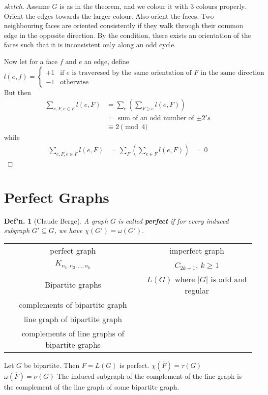 \documentclass[12pt, a4paper]{book}
\newtheorem{definition}[theorem]{Def'n.}
\theoremstyle{nonumberplain}
\newtheorem{proof}{Proof}
\begin{document}
\begin{proof}[sketch]
    Assume $G$ is as in the theorem, and we colour it with 3 colours properly.
    Orient the edges towards the larger colour.
    Also orient the faces.
    Two neighbouring faces are oriented consistently if they walk through their common edge in the opposite direction.
    By the condition, there exists an orientation of the faces such that it is inconsistent only along an odd cycle.
    
    Now let for a face $f$ and $e$ an edge, define
    \begin{equation*}l(e,f)=
        \begin{cases}
            +1 &\text{if $e$ is traveresed by the same orientation of $F$ in the same direction}\\
            -1 &\text{otherwise}
        \end{cases}
    \end{equation*}
    But then
    \begin{align*}
        \sum\limits_{e,F,e\in F}l(e,F) &= \sum\limits_{e}\left(\sum\limits_{F\ni e} l(e,F)\right)\\
                                       &= \text{ sum of an odd number of $\pm 2's$}\\
                                       &\equiv 2\pmod{4}
    \end{align*}
    while
    \begin{align*}
        \sum\limits_{e,F,e\in F}l(e,F) &= \sum\limits_{F}\left(\sum\limits_{e\in F} l(e,F)\right)
                                       &= 0
    \end{align*}
\end{proof}
\begin{center}
    \begin{tikzpicture}
    \end{tikzpicture}
\end{center}
\section{Perfect Graphs}
\begin{definition}[Claude Berge]
    A graph $G$ is called \textbf{perfect} if for every induced subgraph $G'\subseteq G$, we have $\chi(G')=\omega(G')$.
\end{definition}
\begin{tabular}{c|c}
    perfect graph & imperfect graph\\
    $K_{n_1,n_2,\ldots,n_k}$ & $C_{2k+1}$, $k\geq 1$\\
    Bipartite graphs & $L(G)$ where $|G|$ is odd and regular\\
    complements of bipartite graph &\\
    line graph of bipartite graph &\\
    complements of line graphs of bipartite graphs
\end{tabular}
Let $G$ be bipartite.
Then $F=L(G)$ is perfect.
$\chi(\overline{F})=\tau(G)$
$\omega(\overline{F})=\nu(G)$
The induced subgraph of the complement of the line graph is the complement of the line graph of some bipartite graph.
\end{document}
